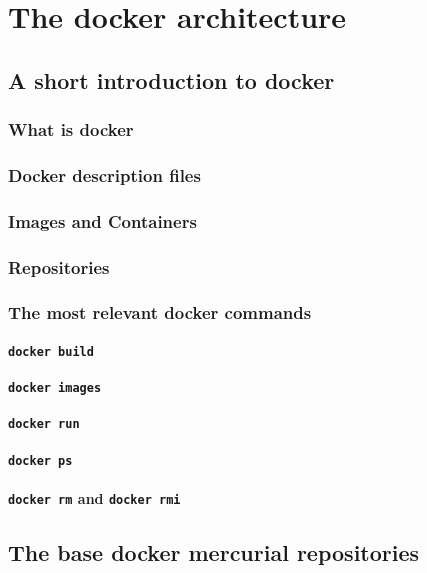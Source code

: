 \chapter{The docker architecture}\label{p01:ch5}
	\section{A short introduction to docker}
		\subsection{What is docker}
		\subsection{Docker description files}
		\subsection{Images and Containers}
		\subsection{Repositories}
		\subsection{The most relevant docker commands}
			\subsubsection{\texttt{docker build}}
			\subsubsection{\texttt{docker images}}
			\subsubsection{\texttt{docker run}}
			\subsubsection{\texttt{docker ps}}
			\subsubsection{\texttt{docker rm} and \texttt{docker rmi}}
	\section{The base docker mercurial repositories}
